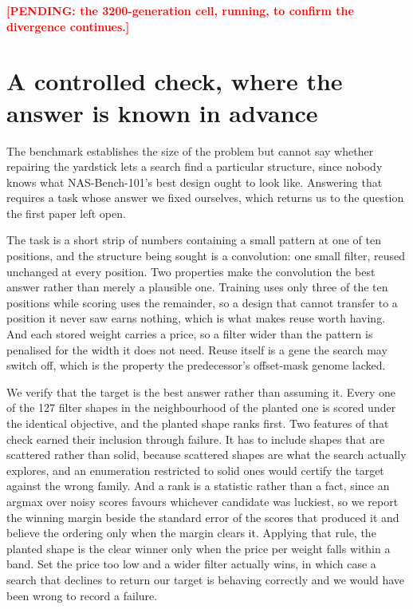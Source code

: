 \documentclass[11pt]{article}
\newcommand{\pending}[1]{\textcolor{red}{\textbf{[PENDING: #1]}}}
\begin{document}
\pending{the 3200-generation cell, running, to confirm the divergence continues.}

\section{A controlled check, where the answer is known in advance}\label{sec:toy}

The benchmark establishes the size of the problem but cannot say whether repairing the yardstick lets a
search find a particular structure, since nobody knows what NAS-Bench-101's best design ought to look
like. Answering that requires a task whose answer we fixed ourselves, which returns us to the question
the first paper left open.

The task is a short strip of numbers containing a small pattern at one of ten positions, and the
structure being sought is a convolution: one small filter, reused unchanged at every position. Two
properties make the convolution the best answer rather than merely a plausible one. Training
uses only three of the ten positions while scoring uses the remainder, so a design that cannot transfer
to a position it never saw earns nothing, which is what makes reuse worth having. And each stored weight
carries a price, so a filter wider than the pattern is penalised for the width it does not need. Reuse
itself is a gene the search may switch off, which is the property the predecessor's offset-mask genome
lacked.

We verify that the target is the best answer rather than assuming it. Every one of the 127 filter shapes
in the neighbourhood of the planted one is scored under the identical objective, and the planted shape
ranks first. Two features of that check earned their inclusion through failure. It has to include shapes
that are scattered rather than solid, because scattered shapes are what the search actually explores, and
an enumeration restricted to solid ones would certify the target against the wrong family. And a rank is
a statistic rather than a fact, since an argmax over noisy scores favours whichever candidate was
luckiest, so we report the winning margin beside the standard error of the scores that produced it and
believe the ordering only when the margin clears it. Applying that rule, the planted shape is the clear
winner only when the price per weight falls within a band. Set the price too low and a wider filter
actually wins, in which case a search that declines to return our target is behaving correctly and we
would have been wrong to record a failure.
\end{document}
